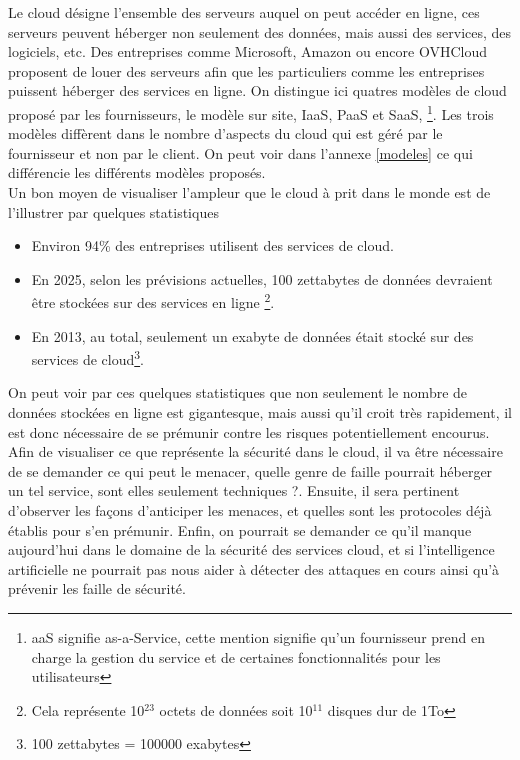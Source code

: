 \documentclass[a4paper, 12pt]{article}
\begin{document}
\begin{spacing}{1.1}
    Le cloud désigne l'ensemble des serveurs auquel on peut accéder en ligne,
    ces serveurs peuvent héberger non seulement des données, mais aussi des
    services, des logiciels, etc. Des entreprises comme Microsoft, Amazon ou
    encore OVHCloud proposent de louer des serveurs afin que les particuliers
    comme les entreprises puissent héberger des services en ligne. On distingue
    ici quatres modèles de cloud proposé par les fournisseurs, le modèle sur
    site, IaaS, PaaS et SaaS, \footnote{aaS signifie as-a-Service, cette mention
    signifie qu'un fournisseur prend en charge la gestion du service et de
    certaines fonctionnalités pour les utilisateurs}. Les trois modèles
    diffèrent dans le nombre d'aspects du cloud qui est géré par le fournisseur
    et non par le client. On peut voir dans l'annexe \ref{modeles} ce qui
    différencie les différents modèles proposés. \\

    Un bon moyen de visualiser l'ampleur que le cloud à prit dans le monde est
    de l'illustrer par quelques statistiques

    \begin{itemize}
      \item Environ 94\% des entreprises utilisent des services de cloud.
      \item En 2025, selon les prévisions actuelles, 100 zettabytes de données
            devraient être stockées sur des services en ligne
            \footnote{Cela représente 10$^{23}$ octets de données soit
            10$^{11}$ disques dur de 1To}.
      \item En 2013, au total, seulement un exabyte de données était stocké
            sur des services de cloud\footnote{100 zettabytes = 100000
            exabytes}.
    \end{itemize}

    On peut voir par ces quelques statistiques que non seulement le nombre de
    données stockées en ligne est gigantesque, mais aussi qu'il croit très
    rapidement, il est donc nécessaire de se prémunir contre les risques
    potentiellement encourus. \\

    Afin de visualiser ce que représente la sécurité dans le cloud, il va être
    nécessaire de se demander ce qui peut le menacer, quelle genre de faille
    pourrait héberger un tel service, sont elles seulement techniques ?.
    Ensuite, il sera pertinent d'observer les façons d'anticiper les menaces, et
    quelles sont les protocoles déjà établis pour s'en prémunir. Enfin, on
    pourrait se demander ce qu'il manque aujourd'hui dans le domaine de la
    sécurité des services cloud, et si l'intelligence artificielle ne pourrait
    pas nous aider à détecter des attaques en cours ainsi qu'à prévenir les
    faille de sécurité.


\end{spacing}
\end{document}
